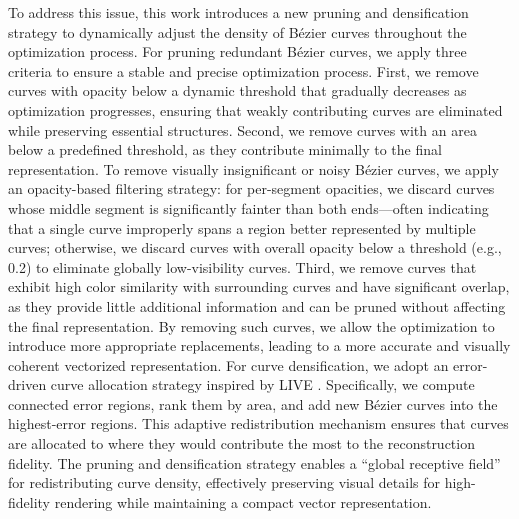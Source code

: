To address this issue, this work introduces a new pruning and densification strategy to dynamically adjust the density of Bézier curves throughout the optimization process. For pruning redundant Bézier curves, we apply three criteria to ensure a stable and precise optimization process. First, we remove curves with opacity below a dynamic threshold that gradually decreases as optimization progresses, ensuring that weakly contributing curves are eliminated while preserving essential structures. Second, we remove curves with an area below a predefined threshold, as they contribute minimally to the final representation. To remove visually insignificant or noisy Bézier curves, we apply an opacity-based filtering strategy: for per-segment opacities, we discard curves whose middle segment is significantly fainter than both ends—often indicating that a single curve improperly spans a region better represented by multiple curves; otherwise, we discard curves with overall opacity below a threshold (e.g., 0.2) to eliminate globally low-visibility curves. Third, we remove curves that exhibit high color similarity with surrounding curves and have significant overlap, as they provide little additional information and can be pruned without affecting the final representation. By removing such curves, we allow the optimization to introduce more appropriate replacements, leading to a more accurate and visually coherent vectorized representation. For curve densification, we adopt an error-driven curve allocation strategy inspired by LIVE \cite{xu2022live}. Specifically, we compute connected error regions, rank them by area, and add new Bézier curves into the highest-error regions. This adaptive redistribution mechanism ensures that curves are allocated to where they would contribute the most to the reconstruction fidelity. The pruning and densification strategy enables a ``global receptive field'' for redistributing curve density, effectively preserving visual details for high-fidelity rendering while maintaining a compact vector representation.